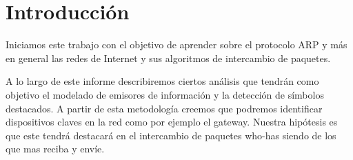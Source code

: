 \section{Introducción}

Iniciamos este trabajo con el objetivo de aprender sobre el protocolo ARP y más en general las redes de Internet y sus algoritmos de intercambio de paquetes.

A lo largo de este informe describiremos ciertos análisis que tendrán como objetivo el modelado de emisores de información y la detección de símbolos destacados. A partir de esta metodología creemos que podremos identificar dispositivos claves en la red como por ejemplo el gateway. Nuestra hipótesis es que este tendrá destacará en el intercambio de paquetes who-has siendo de los que mas reciba y envíe.
